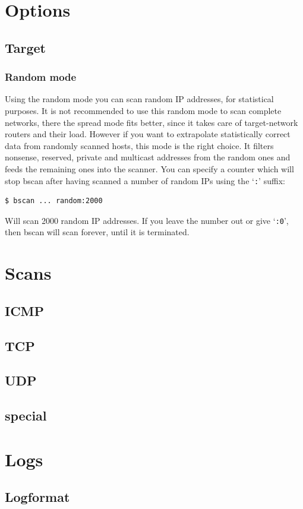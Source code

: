 \documentclass[11pt,a4paper,twoside]{article}
\begin{document}
\section{Options}
\subsection{Target}
\subsubsection{Random mode}
Using the random mode you can scan random IP addresses, for statistical
purposes. It is not recommended to use this random mode to scan complete
networks, there the spread mode fits better, since it takes care of
target-network routers and their load. However if you want to extrapolate
statistically correct data from randomly scanned hosts, this mode is the
right choice. It filters nonsense, reserved, private and multicast addresses
from the random ones and feeds the remaining ones into the scanner. You can
specify a counter which will stop bscan after having scanned a number of
random IPs using the `{\tt :}' suffix:
\begin{verbatim}
$ bscan ... random:2000
\end{verbatim}
Will scan 2000 random IP addresses. If you leave the number out or give
`{\tt :0}', then bscan will scan forever, until it is terminated.


\section{Scans}
\subsection{ICMP}
\subsection{TCP}
\subsection{UDP}
\subsection{special}

\section{Logs}
\subsection{Logformat}
\end{document}
